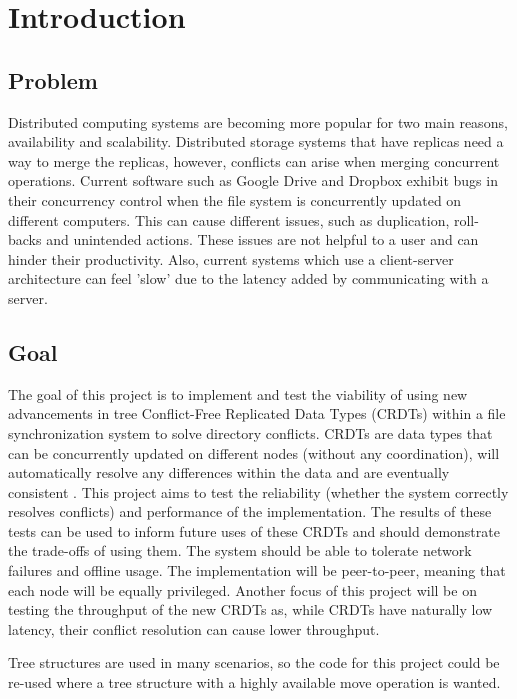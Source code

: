 \documentclass[12pt]{article}
\begin{document}
\newpage
\section{Introduction}

\subsection{Problem}
Distributed computing systems are becoming more popular for two main reasons, availability and scalability. Distributed storage systems that have replicas need a way to merge the replicas, however, conflicts can arise when merging concurrent operations. Current software such as Google Drive and Dropbox exhibit bugs in their concurrency control when the file system is concurrently updated on different computers. This can cause different issues, such as duplication, roll-backs and unintended actions. These issues are not helpful to a user and can hinder their productivity. Also, current systems which use a client-server architecture can feel 'slow' due to the latency added by communicating with a server.

\subsection{Goal}
The goal of this project is to implement and test the viability of using new advancements in tree Conflict-Free Replicated Data Types (CRDTs) within a file synchronization system to solve directory conflicts. CRDTs are data types that can be concurrently updated on different nodes (without any coordination), will automatically resolve any differences within the data and are eventually consistent \cite{10.1007/978-3-642-24550-3_29}.  This project aims to test the reliability (whether the system correctly resolves conflicts) and performance of the implementation. The results of these tests can be used to inform future uses of these CRDTs and should demonstrate the trade-offs of using them. The system should be able to tolerate network failures and offline usage. The implementation will be peer-to-peer, meaning that each node will be equally privileged. Another focus of this project will be on testing the throughput of the new CRDTs as, while CRDTs have naturally low latency, their conflict resolution can cause lower throughput. \par
Tree structures are used in many scenarios, so the code for this project could be re-used where a tree structure with a highly available move operation is wanted.
\end{document}
